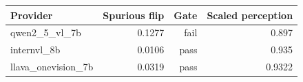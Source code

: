 \begin{tabular}{lrrr}
\toprule
Provider & Spurious flip & Gate & Scaled perception \\
\midrule
qwen2\_5\_vl\_7b & 0.1277 & fail & 0.897 \\
internvl\_8b & 0.0106 & pass & 0.935 \\
llava\_onevision\_7b & 0.0319 & pass & 0.9322 \\
\bottomrule
\end{tabular}
